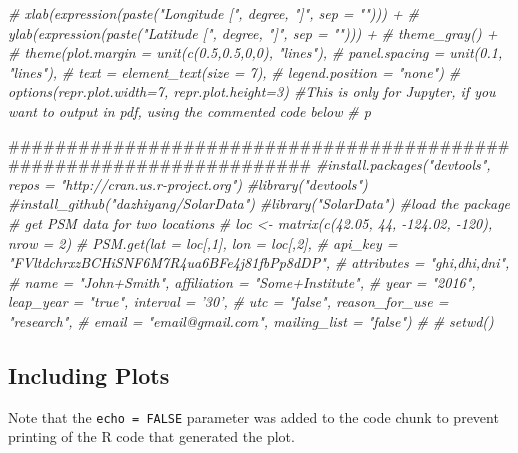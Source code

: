 \documentclass[twocolumn]{article}
\newenvironment{Shaded}{\begin{snugshade}}{\end{snugshade}}
\newcommand{\CommentTok}[1]{\textcolor[rgb]{0.56,0.35,0.01}{\textit{#1}}}
\newcommand{\NormalTok}[1]{#1}
\begin{document}
\begin{Shaded}
\begin{Highlighting}[]
\CommentTok{#      xlab(expression(paste("Longitude [", degree, "]", sep = ""))) +}
\CommentTok{#      ylab(expression(paste("Latitude [", degree, "]", sep = ""))) +}
\CommentTok{#      theme_gray() +}
\CommentTok{#      theme(plot.margin = unit(c(0.5,0.5,0,0), "lines"), }
\CommentTok{#            panel.spacing = unit(0.1, "lines"), }
\CommentTok{#            text = element_text(size = 7), }
\CommentTok{#            legend.position = "none")  }
\CommentTok{# options(repr.plot.width=7, repr.plot.height=3) #This is only for Jupyter, if you want to output in pdf, using the commented code below}
\CommentTok{# p}
\end{Highlighting}
\end{Shaded}

\begin{Shaded}
\begin{Highlighting}[]
\NormalTok{#####################################################################}
\CommentTok{#install.packages("devtools", repos = "http://cran.us.r-project.org")}
\CommentTok{#library("devtools")}
\CommentTok{#install_github("dazhiyang/SolarData")}
\CommentTok{#library("SolarData") #load the package}
\CommentTok{# get PSM data for two locations}
\CommentTok{# loc <- matrix(c(42.05, 44, -124.02, -120), nrow = 2)}
\CommentTok{# PSM.get(lat = loc[,1], lon = loc[,2],}
\CommentTok{#        api_key = "FVltdchrxzBCHiSNF6M7R4ua6BFe4j81fbPp8dDP",}
\CommentTok{#        attributes = "ghi,dhi,dni",}
\CommentTok{#        name = "John+Smith", affiliation = "Some+Institute",}
\CommentTok{#        year = "2016", leap_year = "true", interval = '30',}
\CommentTok{#        utc = "false", reason_for_use = "research",}
\CommentTok{#        email = "email@gmail.com", mailing_list = "false")}
\CommentTok{# }
\CommentTok{# setwd()}
\end{Highlighting}
\end{Shaded}

\subsection{Including Plots}\label{including-plots}

Note that the \texttt{echo\ =\ FALSE} parameter was added to the code
chunk to prevent printing of the R code that generated the plot.
\end{document}
